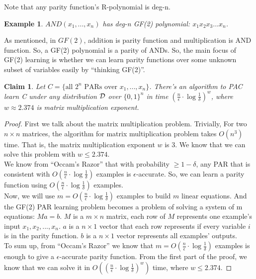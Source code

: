 \documentclass[12pt]{article}
\newtheorem{claim}[theorem]{Claim}
\newtheorem{example}[theorem]{Example}
\newcommand{\cald}{{\cal D}}
\begin{document}
Note that any parity function's R-polynomial is deg-n. 

\begin{example}
$AND(x_1,...,x_n)$ has deg-n GF(2) polynomial: $x_1x_2x_3...x_n$.
\end{example}

As mentioned, in $GF(2)$, addition is parity function and
multiplication is AND function. So, a GF(2) polynomial is a parity of
ANDs. So, the main focus of GF(2) learning is whether we can 
learn parity functions over some unknown subset of variables easily by
``thinking GF(2)''.

\begin{claim}
Let $C = \{ \text {all } 2^n \text { PARs over } x_1,...,x_n
\}$. There's an algorithm to PAC learn C under any distribution $\cald$
over $\{ 0, 1\}^n$ in time $(\frac {n}{\epsilon} \cdot \log {\frac
  {1}{\delta}})^w$, where $w \approx 2.374$ is matrix multiplication
exponent.
\end{claim}

\begin{proof}
First we talk about the matrix multiplication problem. Trivially,
For two $n \times n$ matrices, the algorithm for matrix multiplication
problem takes $O(n^3)$ time. That is, the matrix multiplication
exponent $w$ is 3. We know that we can solve this problem with $w \le
2.374$. \\

We know from ``Occam's Razor'' that with  probability $\ge 1 -
\delta$, any PAR that is consistent with $O(\frac {n}{\epsilon} \cdot
\log {\frac {1}{\delta}})$ examples is $\epsilon$-accurate. So, we
can learn a parity function using $O(\frac {n}{\epsilon} \cdot \log
{\frac {1}{\delta}})$ examples. \\

Now, we will use $m = O(\frac {n}{\epsilon} \cdot \log {\frac
  {1}{\delta}})$ examples to build $m$ linear equations. And the GF(2)
PAR learning problem becomes a problem of solving a system of m
equations: $Ma = b$. $M$ is a $m \times n$ matrix, each row of $M$
represents one example's input $x_1, x_2, ..., x_n$. $a$ is a $n
\times 1$ vector that each row represents if every variable $i$ is in
the parity function. $b$ is a $n \times 1$ vector represents all
examples' outputs. \\

To sum up, from ``Occam's Razor'' we know that $m = O(\frac
{n}{\epsilon} \cdot \log {\frac {1}{\delta}})$ examples is enough to
give a $\epsilon$-accurate parity function. From the first part of the
proof, we know that we can solve it in $O((\frac {n}{\epsilon} \cdot
\log {\frac {1}{\delta}})^w)$ time, where $w \le 2.374$. 
\end{proof}
\end{document}
